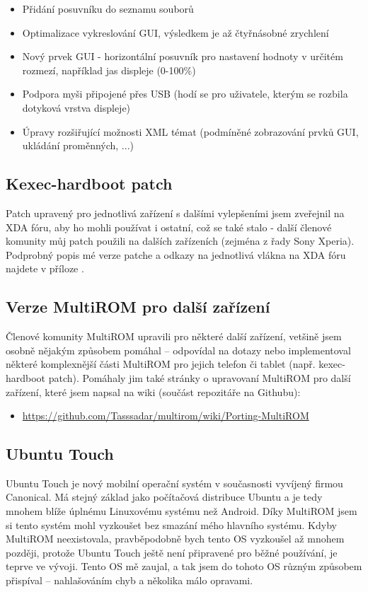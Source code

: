 \documentclass[12pt, a4paper, oneside]{article}
\begin{document}
\begin{itemize}
    \item Přidání posuvníku do seznamu souborů
    \item Optimalizace vykreslování GUI, výsledkem je až čtyřnásobné zrychlení
    \item Nový prvek GUI - horizontální posuvník pro nastavení hodnoty v určitém rozmezí, například jas displeje (0-100\%)
    \item Podpora myši připojené přes USB (hodí se pro uživatele, kterým se rozbila dotyková vrstva displeje)
    \item Úpravy rozšiřující možnosti XML témat (podmíněné zobrazování prvků GUI, ukládání proměnných, ...)
\end{itemize}

\subsection{Kexec-hardboot patch}
Patch upravený pro jednotlivá zařízení s dalšími vylepšeními jsem zveřejnil na XDA fóru, aby ho mohli používat i ostatní, což se také stalo - další členové komunity můj patch použili na dalších zařízeních (zejména z řady Sony Xperia). Podprobný popis mé verze patche a odkazy na jednotlivá vlákna na XDA fóru najdete v příloze .

\subsection{Verze MultiROM pro další zařízení}
Členové komunity MultiROM upravili pro některé další zařízení, vetšině jsem osobně nějakým způsobem pomáhal -- odpovídal na dotazy nebo implementoval některé komplexnější části MultiROM pro jejich telefon či tablet (např. kexec-hardboot patch). Pomáhaly jim také stránky o upravovaní MultiROM pro další zařízení, které jsem napsal na wiki (součást repozitáře na Githubu):

\begin{itemize}
    \item \url{https://github.com/Tasssadar/multirom/wiki/Porting-MultiROM}
\end{itemize}

\subsection{Ubuntu Touch}
Ubuntu Touch\cite{utouch} je nový mobilní operační systém v současnosti vyvíjený firmou Canonical. Má stejný základ jako počítačová distribuce Ubuntu a je tedy mnohem blíže úplnému Linuxovému systému než Android. Díky MultiROM jsem si tento systém mohl vyzkoušet bez smazání mého hlavního systému. Kdyby MultiROM neexistovala, pravběpodobně bych tento OS vyzkoušel až mnohem později, protože Ubuntu Touch ještě není připravené pro běžné používání, je teprve ve vývoji. Tento OS mě zaujal, a tak jsem do tohoto OS různým způsobem přispíval -- nahlašováním chyb a několika málo opravami.
\end{document}
